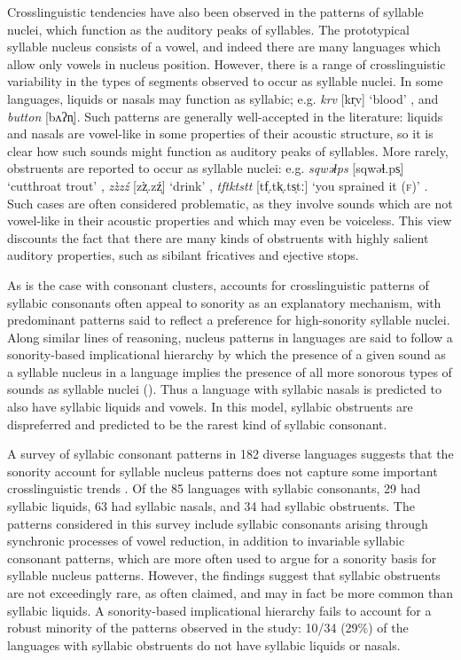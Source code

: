   Crosslinguistic tendencies have also been observed in the patterns of syllable nuclei, which function as the auditory peaks of syllables. The prototypical syllable nucleus consists of a vowel, and indeed there are many languages which allow only vowels in nucleus position. However, there is a range of crosslinguistic variability in the types of segments observed to occur as syllable nuclei. In some languages, liquids or nasals may function as syllabic; e.g.  \textit{krv} [kr̩v] ‘blood’ \citep[186]{Zec2007}, and  \textit{button} [bʌʔn̩]. Such patterns are generally well-accepted in the literature: liquids and nasals are vowel-like in some properties of their acoustic structure, so it is clear how such sounds might function as auditory peaks of syllables. More rarely, obstruents are reported to occur as syllable nuclei: e.g.  \textit{sqwəɬps} [sqwəɬ.ps̩] ‘cutthroat trout’ \citep[62]{Hoard1978},  \textit{zz̀zź} [z\`z̩.zź̩] ‘drink’ \citep[483]{Demolin2002},  \textit{tftktstt} [tf̩.tk̩.ts̩tː] ‘you sprained it (\textsc{f})’ \citep[332]{Ridouane2008}. Such cases are often considered problematic, as they involve sounds which are not vowel-like in their acoustic properties and which may even be voiceless. This view discounts the fact that there are many kinds of obstruents with highly salient auditory properties, such as sibilant fricatives and ejective stops.

  As is the case with consonant clusters, accounts for crosslinguistic patterns of syllabic consonants often appeal to sonority as an explanatory mechanism, with predominant patterns said to reflect a preference for high-sonority syllable nuclei. Along similar lines of reasoning, nucleus patterns in languages are said to follow a sonority-based implicational hierarchy by which the presence of a given sound as a syllable nucleus in a language implies the presence of all more sonorous types of sounds as syllable nuclei (\citealt{Blevins1995,Zec2007}). Thus a language with syllabic nasals is predicted to also have syllabic liquids and vowels. In this model, syllabic obstruents are dispreferred and predicted to be the rarest kind of syllabic consonant.

  A survey of syllabic consonant patterns in 182 diverse languages suggests that the sonority account for syllable nucleus patterns does not capture some important crosslinguistic trends \citep{Bell1978a}. Of the 85 languages with syllabic consonants, 29 had syllabic liquids, 63 had syllabic nasals, and 34 had syllabic obstruents. The patterns considered in this survey include syllabic consonants arising through synchronic processes of vowel reduction, in addition to invariable syllabic consonant patterns, which are more often used to argue for a sonority basis for syllable nucleus patterns. However, the findings suggest that syllabic obstruents are not exceedingly rare, as often claimed, and may in fact be more common than syllabic liquids. A sonority-based implicational hierarchy fails to  account for a robust minority of the patterns observed in the study: 10/34 (29\%) of the languages with syllabic obstruents do not have syllabic liquids or nasals.

